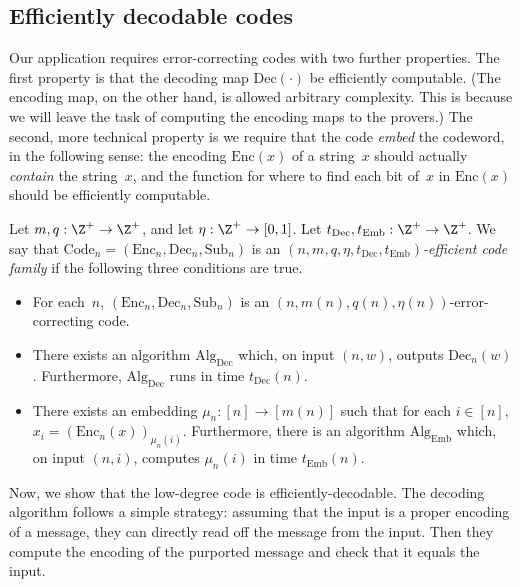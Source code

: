 \documentclass[11pt]{article}
\newcommand{\codec}{\mathrm{Code}}
\newcommand{\codee}{\mathrm{Enc}}
\newcommand{\coded}{\mathrm{Dec}}
\newcommand{\codes}{\mathrm{Sub}}
\begin{document}
\subsection{Efficiently decodable codes}

Our application requires error-correcting codes with two further properties.
The first property is that the decoding map $\coded(\cdot)$ be efficiently computable.
(The encoding map, on the other hand, is allowed arbitrary complexity.
This is because we will leave the task of computing the encoding maps to the provers.) 
The second, more technical property is
we require that the code \emph{embed} the codeword, in the following sense:
the encoding $\codee(x)$ of a string~$x$ should actually \emph{contain} the string~$x$,
and the function for where to find each bit of~$x$ in $\codee(x)$ should be efficiently computable.

\begin{definition}\label{def:efficient-codes}
Let $m, q:\Z^+\rightarrow \Z^+$,
and let $\eta:\Z^+\rightarrow [0, 1]$.
Let $t_{\mathrm{Dec}}, t_{\mathrm{Emb}}:\Z^+ \rightarrow \Z^+$.
We say that $\codec_n=(\codee_n, \coded_n, \codes_n)$ is an \emph{$(n, m, q, \eta, t_{\mathrm{Dec}}, t_{\mathrm{Emb}})$-efficient code family}
if the following three conditions are true.
\begin{itemize}
\item[$\circ$] For each~$n$, $(\codee_n, \coded_n, \codes_n)$ is an $(n, m(n), q(n), \eta(n))$-error-correcting code.
\item[$\circ$] There exists an algorithm $\mathrm{Alg}_{\coded}$ which, on input $(n, w)$, outputs $\coded_n(w)$.
			Furthermore, $\mathrm{Alg}_{\coded}$ runs in time $t_{\mathrm{Dec}}(n)$.
\item[$\circ$] There exists an embedding $\mu_n:[n] \rightarrow [m(n)]$ such that for each $i \in [n]$, $x_i = (\codee_n(x))_{\mu_n(i)}$.
			Furthermore, there is an algorithm $\mathrm{Alg}_{\mathrm{Emb}}$ which, on input $(n, i)$, computes $\mu_n(i)$ in time
			 $t_{\mathrm{Emb}}(n)$.
\end{itemize}
\end{definition}

Now, we show that the low-degree code is efficiently-decodable.
The decoding algorithm follows a simple strategy:
assuming that the input is a proper encoding of a message,
they can directly read off the message from the input.
Then they compute the encoding of the purported message and check that it equals the input.
\end{document}
